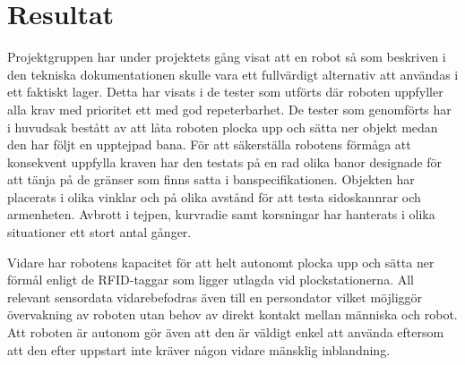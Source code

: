 
\section{Resultat}

Projektgruppen har under projektets gång visat att en robot så som beskriven i den tekniska dokumentationen skulle vara ett fullvärdigt alternativ att användas i ett faktiskt lager. Detta har visats i de tester som utförts där roboten uppfyller alla krav med prioritet ett med god repeterbarhet. De tester som genomförts har i huvudsak bestått av att låta roboten plocka upp och sätta ner objekt medan den har följt en upptejpad bana. För att säkerställa robotens förmåga att konsekvent uppfylla kraven har den testats på en rad olika banor designade för att tänja på de gränser som finns satta i banspecifikationen. Objekten har placerats i olika vinklar och på olika avstånd för att testa sidoskannrar och armenheten. Avbrott i tejpen, kurvradie samt korsningar har hanterats i olika situationer ett stort antal gånger.

Vidare har robotens kapacitet för att helt autonomt plocka upp och sätta ner förmål enligt de RFID-taggar som ligger utlagda vid plockstationerna. All relevant sensordata vidarebefodras även till en persondator vilket möjliggör övervakning av roboten utan behov av direkt kontakt mellan människa och robot. Att roboten är autonom gör även att den är väldigt enkel att använda eftersom att den efter uppstart inte kräver någon vidare mänsklig inblandning.
